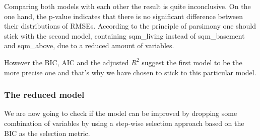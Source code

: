 \documentclass[table]{article}
\newenvironment{Shaded}{\begin{snugshade}}{\end{snugshade}}
\newcommand{\KeywordTok}[1]{\textcolor[rgb]{0.13,0.29,0.53}{\textbf{#1}}}
\newcommand{\DataTypeTok}[1]{\textcolor[rgb]{0.13,0.29,0.53}{#1}}
\newcommand{\DecValTok}[1]{\textcolor[rgb]{0.00,0.00,0.81}{#1}}
\newcommand{\StringTok}[1]{\textcolor[rgb]{0.31,0.60,0.02}{#1}}
\newcommand{\OperatorTok}[1]{\textcolor[rgb]{0.81,0.36,0.00}{\textbf{#1}}}
\newcommand{\NormalTok}[1]{#1}
\begin{document}
\hfill\break
Comparing both models with each other the result is quite inconclusive.
On the one hand, the p-value indicates that there is no significant
difference between their distributions of RMSEs. According to the
principle of parsimony one should stick with the second model,
containing sqm\_living instead of sqm\_basement and sqm\_above, due to a
reduced amount of variables.

However the BIC, AIC and the adjusted \(R^2\) suggest the first model to
be the more precise one and that's why we have chosen to stick to this
particular model.

\subsubsection{The reduced model}\label{the-reduced-model}

We are now going to check if the model can be improved by dropping some
combination of variables by using a step-wise selection approach based
on the BIC as the selection metric. \hfill\break

\begin{Shaded}
\end{Shaded}
\end{document}
